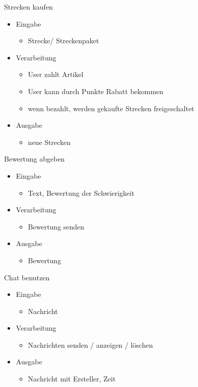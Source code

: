 \documentclass[a4paper, 12pt]{article}
\begin{document}
\bigskip
{\Large Strecken kaufen}\\
\begin{itemize}
\item Eingabe
	\begin{itemize}
	\item Strecke/ Streckenpaket
	\end{itemize}
\item Verarbeitung
	\begin{itemize}
	\item User zahlt Artikel
	\item User kann durch Punkte Rabatt bekommen
	\item wenn bezahlt, werden gekaufte Strecken freigeschaltet
	\end{itemize}
\item Ausgabe
	\begin{itemize}
	\item neue Strecken
	\end{itemize}
\end{itemize}

\bigskip
{\Large Bewertung abgeben}\\
\begin{itemize}
\item Eingabe
	\begin{itemize}
	\item Text, Bewertung der Schwierigkeit
	\end{itemize}
\item Verarbeitung
	\begin{itemize}
	\item Bewertung senden
	\end{itemize}
\item Ausgabe
	\begin{itemize}
	\item Bewertung
	\end{itemize}
\end{itemize}

\bigskip
{\Large Chat benutzen}\\
\begin{itemize}
\item Eingabe
	\begin{itemize}
	\item Nachricht
	\end{itemize}
\item Verarbeitung
	\begin{itemize}
	\item Nachrichten senden / anzeigen / löschen
	\end{itemize}
\item Ausgabe
	\begin{itemize}
	\item Nachricht mit Ersteller, Zeit
	\end{itemize}
\end{itemize}
\end{document}
